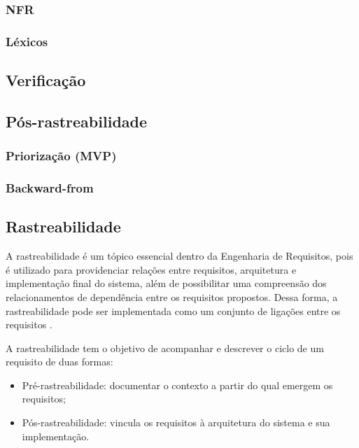 \subsubsection{NFR}

\subsubsection{Léxicos}

\subsection {Verificação}

\subsection {Pós-rastreabilidade}

\subsubsection{Priorização (MVP)}

\subsubsection{Backward-from}

\subsection {Rastreabilidade}
A rastreabilidade é um tópico essencial dentro da Engenharia de Requisitos, pois é utilizado para providenciar relações entre requisitos, arquitetura e implementação final do sistema, além de possibilitar uma compreensão dos relacionamentos de dependência entre os requisitos propostos. Dessa forma, a rastreabilidade pode ser implementada como um conjunto de ligações entre os requisitos \cite{sayao2006rastreabilidade}.

A rastreabilidade tem o objetivo de acompanhar e descrever o ciclo de um requisito de duas formas:
\begin{itemize}
    \item Pré-rastreabilidade: documentar o contexto a partir do qual emergem os requisitos;
    \item Pós-rastreabilidade: vincula os requisitos à arquitetura do sistema e sua implementação.
\end{itemize}